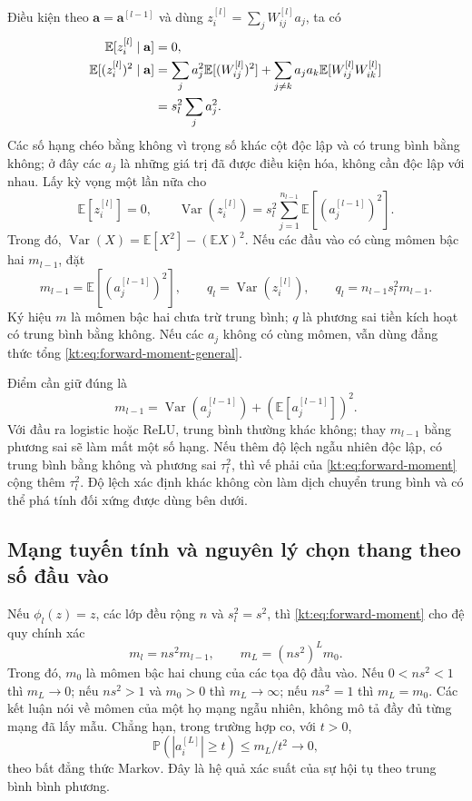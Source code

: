 Điều kiện theo $\mathbf a=\mathbf a^{[l-1]}$ và dùng
$z_i^{[l]}=\sum_j W_{ij}^{[l]}a_j$, ta có
\begin{align}
 \mathbb E[z_i^{[l]}\mid\mathbf a]&=0,\notag\\
 \mathbb E[(z_i^{[l]})^2\mid\mathbf a]
 &=\sum_j a_j^2\mathbb E[(W_{ij}^{[l]})^2]
   +\sum_{j\ne k}a_ja_k\mathbb E[W_{ij}^{[l]}W_{ik}^{[l]}]\notag\\
 &=s_l^2\sum_j a_j^2.
 \label{kt:eq:conditional-second}
\end{align}
Các số hạng chéo bằng không vì trọng số khác cột độc lập và có
trung bình bằng không; ở đây các $a_j$ là những giá trị đã được
điều kiện hóa, không cần độc lập với nhau.
Lấy kỳ vọng một lần nữa cho
\begin{equation}
 \mathbb E[z_i^{[l]}]=0,\qquad
 \operatorname{Var}(z_i^{[l]})
 =s_l^2\sum_{j=1}^{n_{l-1}}\mathbb E[(a_j^{[l-1]})^2].
 \label{kt:eq:forward-moment-general}
\end{equation}
Trong đó, $\operatorname{Var}(X)=\mathbb E[X^2]-(\mathbb EX)^2$.
Nếu các đầu vào có cùng mômen bậc hai $m_{l-1}$, đặt
\begin{equation}
 m_{l-1}=\mathbb E[(a_j^{[l-1]})^2],\qquad
 q_l=\operatorname{Var}(z_i^{[l]}),\qquad
 q_l=n_{l-1}s_l^2m_{l-1}.
 \label{kt:eq:forward-moment}
\end{equation}
Ký hiệu $m$ là mômen bậc hai chưa trừ trung bình; $q$ là phương
sai tiền kích hoạt có trung bình bằng không. Nếu các $a_j$ không
có cùng mômen, vẫn dùng đẳng thức tổng
\eqref{kt:eq:forward-moment-general}.

Điểm cần giữ đúng là
\begin{equation}
 m_{l-1}=\operatorname{Var}(a_j^{[l-1]})
                +(\mathbb E[a_j^{[l-1]}])^2.
 \label{kt:eq:moment-versus-variance}
\end{equation}
Với đầu ra logistic hoặc ReLU, trung bình thường khác không; thay
$m_{l-1}$ bằng phương sai sẽ làm mất một số hạng. Nếu thêm độ lệch
ngẫu nhiên độc lập, có trung bình bằng không và phương sai
$\tau_l^2$, thì vế phải của \eqref{kt:eq:forward-moment} cộng
thêm $\tau_l^2$. Độ lệch xác định khác không còn làm dịch chuyển
trung bình và có thể phá tính đối xứng được dùng bên dưới.

\subsection{Mạng tuyến tính và nguyên lý chọn thang theo số đầu vào}

Nếu $\phi_l(z)=z$, các lớp đều rộng $n$ và $s_l^2=s^2$, thì
\eqref{kt:eq:forward-moment} cho đệ quy chính xác
\begin{equation}
 m_l=ns^2m_{l-1},\qquad m_L=(ns^2)^Lm_0.
 \label{kt:eq:linear-depth}
\end{equation}
Trong đó, $m_0$ là mômen bậc hai chung của các tọa độ đầu vào.
Nếu $0<ns^2<1$ thì $m_L\to0$; nếu $ns^2>1$ và $m_0>0$ thì
$m_L\to\infty$; nếu $ns^2=1$ thì $m_L=m_0$. Các kết luận nói về
mômen của một họ mạng ngẫu nhiên, không mô tả đầy đủ từng mạng đã
lấy mẫu. Chẳng hạn, trong trường hợp co, với $t>0$,
\[
 \mathbb P(|a_i^{[L]}|\geq t)\leq m_L/t^2\longrightarrow0,
\]
theo bất đẳng thức Markov. Đây là hệ quả xác suất của sự hội tụ
theo trung bình bình phương.

